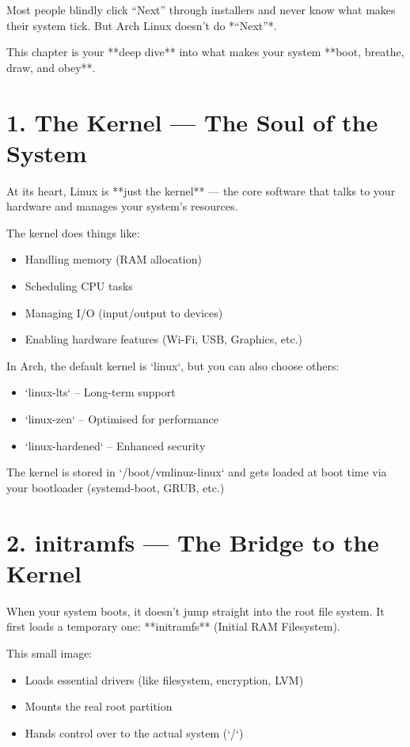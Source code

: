 \documentclass[12pt,openany]{book}
\begin{document}
Most people blindly click “Next” through installers and never know what makes their system tick. But Arch Linux doesn’t do *“Next”*.

This chapter is your **deep dive** into what makes your system **boot, breathe, draw, and obey**.

\section{1. The Kernel — The Soul of the System}

At its heart, Linux is **just the kernel** — the core software that talks to your hardware and manages your system's resources.

The kernel does things like:

\begin{itemize}
  \item Handling memory (RAM allocation)
  \item Scheduling CPU tasks
  \item Managing I/O (input/output to devices)
  \item Enabling hardware features (Wi-Fi, USB, Graphics, etc.)
\end{itemize}

In Arch, the default kernel is `linux`, but you can also choose others:

\begin{itemize}
  \item `linux-lts` – Long-term support
  \item `linux-zen` – Optimised for performance
  \item `linux-hardened` – Enhanced security
\end{itemize}

The kernel is stored in `/boot/vmlinuz-linux` and gets loaded at boot time via your bootloader (systemd-boot, GRUB, etc.)

\section{2. initramfs — The Bridge to the Kernel}

When your system boots, it doesn’t jump straight into the root file system. It first loads a temporary one: **initramfs** (Initial RAM Filesystem).

This small image:
\begin{itemize}
  \item Loads essential drivers (like filesystem, encryption, LVM)
  \item Mounts the real root partition
  \item Hands control over to the actual system (`/`)
\end{itemize}
\end{document}
